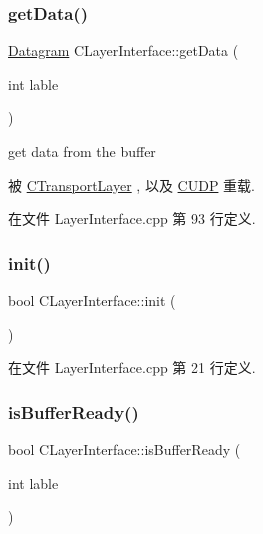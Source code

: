 \subsubsection{\texorpdfstring{get\+Data()}{getData()}}
{\footnotesize\ttfamily \hyperlink{class_datagram}{Datagram} C\+Layer\+Interface\+::get\+Data (\begin{DoxyParamCaption}\item[{int}]{lable }\end{DoxyParamCaption})\hspace{0.3cm}{\ttfamily [virtual]}}

get data from the buffer 

被 \hyperlink{class_c_transport_layer_a9396850eb026ff070c06bfc25dd4979c}{C\+Transport\+Layer} , 以及 \hyperlink{class_c_u_d_p_aa71e49c760769b55dc2251b244eb00ff}{C\+U\+DP} 重载.



在文件 Layer\+Interface.\+cpp 第 93 行定义.

\mbox{\label{class_c_layer_interface_a82cdd178439031dd581a8f7208f2a134}} 
\subsubsection{\texorpdfstring{init()}{init()}}
{\footnotesize\ttfamily bool C\+Layer\+Interface\+::init (\begin{DoxyParamCaption}{ }\end{DoxyParamCaption})}



在文件 Layer\+Interface.\+cpp 第 21 行定义.

\mbox{\label{class_c_layer_interface_a4979d7b5740c06be048e4b0f1195c8fc}} 
\subsubsection{\texorpdfstring{is\+Buffer\+Ready()}{isBufferReady()}}
{\footnotesize\ttfamily bool C\+Layer\+Interface\+::is\+Buffer\+Ready (\begin{DoxyParamCaption}\item[{int}]{lable }\end{DoxyParamCaption})\hspace{0.3cm}{\ttfamily [virtual]}}

